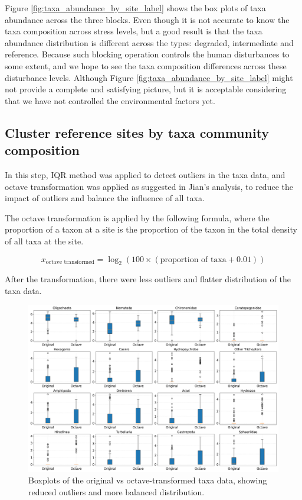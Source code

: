 Figure \textcolor{blue}{\ref{fig:taxa_abundance_by_site_label}} shows the box plots of taxa abundance across the three blocks.
Even though it is not accurate to know the taxa composition across stress levels,
but a good result is that the taxa abundance distribution is different across the types: degraded, intermediate and reference.
Because such blocking operation controls the human disturbances to some extent, and
we hope to see the taxa composition differences across these disturbance levels.
Although Figure \textcolor{blue}{\ref{fig:taxa_abundance_by_site_label}} might not provide a complete and satisfying 
picture, but it is acceptable considering that we have not controlled the environmental factors yet.

\clearpage
\subsection{Cluster reference sites by taxa community composition}

In this step,  IQR method was applied to detect outliers in the taxa data, 
and octave transformation was applied as suggested in Jian's analysis,
to reduce the impact of outliers and balance the influence of all taxa.

The octave transformation is applied by the following formula, where the proportion of a taxon 
at a site is the proportion of the taxon in the total density of all taxa at the site.

\[
x_\text{octave transformed} = \log_2(100 \times (\text{proportion of taxa}  + 0.01))
\]

After the transformation, there were less outliers and flatter distribution of the taxa data.

\begin{figure}[!h]
    \centering
    \includegraphics[width=\textwidth]{../results/preliminary_results/octave_transformed_taxa_boxplots.png}
    \caption{Boxplots of the original vs octave-transformed taxa data, showing reduced outliers and more balanced distribution.}
    \label{fig:octave_transformed_taxa_boxplots}
\end{figure}


